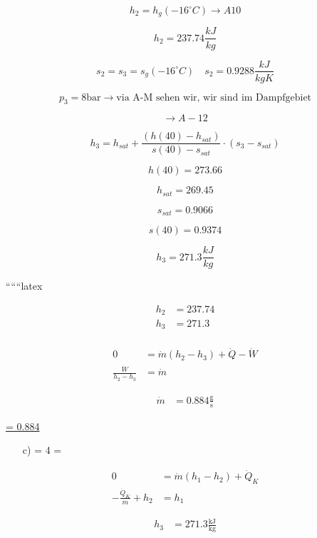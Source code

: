 \[
h_2 = h_g(-16^\circ C) \rightarrow A10
\]

\[
h_2 = 237.74 \frac{kJ}{kg}
\]

\[
s_2 = s_3 = s_g(-16^\circ C) \quad s_2 = 0.9288 \frac{kJ}{kgK}
\]

\[
p_3 = 8 \text{bar} \rightarrow \text{via A-M sehen wir, wir sind im Dampfgebiet}
\]

\[
\rightarrow A-12
\]

\[
h_3 = h_{sat} + \frac{(h(40) - h_{sat})}{s(40) - s_{sat}} \cdot (s_3 - s_{sat})
\]

\[
h(40) = 273.66
\]

\[
h_{sat} = 269.45
\]

\[
s_{sat} = 0.9066
\]

\[
s(40) = 0.9374
\]

\[
h_3 = 271.3 \frac{kJ}{kg}
\]

``````latex


\begin{align*}
h_2 &= 237.74 \\
h_3 &= 271.3 \\
\end{align*}

 \rightarrow {} \quad {}

\begin{align*}
0 &= \dot{m}(h_2 - h_3) + \dot{Q} - \dot{W} \\
\frac{\dot{W}}{h_2 - h_3} &= \dot{m}
\end{align*}

 \quad {}  

\begin{align*}
\dot{m} &= 0.884 \frac{\text{g}}{\text{s}}
\end{align*}

\underline{ = 0.884 }

\begin{itemize}
\item[c)]  \quad {} = 4  \quad {} =  
\end{itemize}

\begin{align*}
0 &= \dot{m}(h_1 - h_2) + \dot{Q}_K \\
-\frac{\dot{Q}_K}{\dot{m}} + h_2 &= h_1
\end{align*}

\begin{align*}
h_3 &= 271.3 \frac{\text{kJ}}{\text{kg}}
\end{align*}

